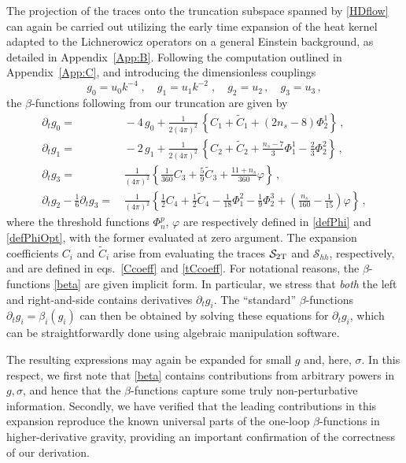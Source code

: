\documentclass[preprint,preprintnumbers,amsmath,amssymb,nofootinbib,APS]{revtex4}
\newcommand{\be}{\begin{equation}}
\newcommand{\ee}{\end{equation}}
\newcommand{\cS}{\mathcal{S}}
\newcommand{\2}{\sqrt{2\,}}
\newcommand{\half}{\tfrac{1}{2}}
\newcommand{\p}{\partial}
\newcommand{\tC}{{\widetilde{C}}}
\begin{document}
The projection of the traces onto the truncation subspace spanned by \eqref{HDflow}
can again be carried out utilizing the early time expansion of the heat kernel adapted to the Lichnerowicz operators on a general Einstein background, as detailed in Appendix~\ref{App:B}. Following the computation outlined in Appendix~\ref{App:C}, and introducing the dimensionless couplings
%
\be\label{dimless}
g_0 = u_0 k^{-4} \; , \quad g_1 = u_1 k^{-2} \; , \quad g_2 = u_2 \, , \quad g_3 = u_3 \, ,
\ee
%
the $\beta$-functions following from our truncation
are given by
%
\be\label{beta}
\begin{split}
\p_t g_0 = & \, -4 \, g_0 + \frac{1}{2(4\pi)^2} \,  \left\{ C_1 + \tC_1 +(2 n_s- 8) \Phi^1_2 \right\} \, , \\
%
 \p_t g_1 = & \, -2 \, g_1 + \frac{1}{2(4\pi)^2} \, \left\{ C_2 + \tC_2 + \tfrac{n_s-7}{3} \Phi^1_1 - \tfrac{2}{3} \Phi^2_2 \right\} \, , \\
%
 \p_t g_3 = & \, \frac{1}{(4 \pi)^2} \left\{ \tfrac{1}{360} C_3 + \tfrac{5}{9} \tC_3 + \tfrac{11+n_s}{360} \varphi \right\} \, , \\
%
 \p_t g_2 - \tfrac{1}{6} \p_t g_3 = & \,  \frac{1}{(4 \pi)^2} \left\{
 \half C_4 + \half \tC_4 - \tfrac{1}{18} \Phi^2_1 - \tfrac{1}{9} \Phi^3_2 +(\tfrac{n_s}{160}- \tfrac{1}{15}) \varphi 
 \right\} \, ,  
\end{split}
\ee
%
where the threshold functions $\Phi_{n}^{p}$,  $\varphi$ are respectively defined in \eqref{defPhi} and \eqref{defPhiOpt}, with the former evaluated at zero argument.
The expansion coefficients $C_i$ and $\tC_i$ arise from evaluating the traces $\cS_{\rm 2T}$ and $\cS_{hh}$, respectively, and are defined in eqs.\ \eqref{Ccoeff} and \eqref{tCcoeff}. For notational reasons, the $\beta$-functions \eqref{beta} are given implicit form. In particular, we stress that {\it both} the left and right-and-side contains derivatives $\p_t g_i$. The ``standard''  $\beta$-functions $\p_t g_i = \beta_i(g_i)$ can then be obtained by solving these equations for $\p_t g_i$, which
can be straightforwardly done using algebraic manipulation software. 

The resulting expressions may again be expanded for small $g$ and, here, $\sigma$. In this respect, we first note that \eqref{beta} contains contributions from arbitrary powers in $g, \sigma$, and hence that the $\beta$-functions capture some truly non-perturbative information. Secondly, we have verified that the leading contributions in this expansion reproduce the known universal parts of the one-loop $\beta$-functions in higher-derivative gravity, providing an important confirmation of the correctness of our derivation.
\end{document}
